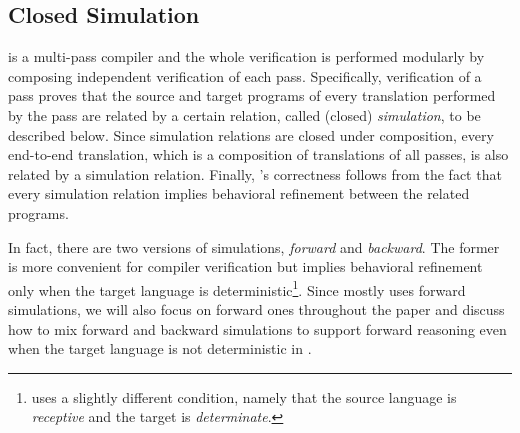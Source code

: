 \subsection{Closed Simulation}
\cc{} is a multi-pass compiler and the whole verification is performed modularly
by composing independent verification of each pass. Specifically,
verification of a pass proves that the source and target programs of every translation
performed by the pass are related by a certain relation,
called (closed) \emph{simulation}, to be described below.
Since simulation relations are closed under composition, every
end-to-end translation, which is a composition of translations of all
passes, is also related by a simulation relation. Finally, \cc{}'s
correctness follows from the fact that every simulation relation implies
behavioral refinement between the related programs.

In fact, there are two versions of simulations, \emph{forward}
and \emph{backward}.  The former is more convenient for compiler
verification but implies behavioral refinement only when the target
language is deterministic\footnote{\cc{} uses a slightly different
  condition, namely that the source language is \emph{receptive} and
  the target is \emph{determinate}.}. Since \cc{} mostly uses forward
simulations, we will also focus on forward ones throughout the paper
and discuss how to mix forward and backward simulations
to support forward reasoning even when the target language is not deterministic
in .


